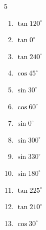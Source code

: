 \begin{multicols}{5}
\begin{enumerate}
  \item $\displaystyle \tan{120^\circ}$


  \item $\displaystyle \tan{0^\circ}$

        \phantom{$\displaystyle =0$}

  \item $\displaystyle \tan{240^\circ}$


  \item $\displaystyle \cos{45^\circ}$


  \item $\displaystyle \sin{30^\circ}$


  \item $\displaystyle \cos{60^\circ}$


  \item $\displaystyle \sin{0^\circ}$

        \phantom{$\displaystyle =0$}

  \item $\displaystyle \sin{300^\circ}$


  \item $\displaystyle \sin{330^\circ}$


  \item $\displaystyle \sin{180^\circ}$

        \phantom{$\displaystyle =0$}

  \item $\displaystyle \tan{225^\circ}$

        \phantom{$\displaystyle =1$}

  \item $\displaystyle \tan{210^\circ}$


  \item $\displaystyle \cos{30^\circ}$



\end{enumerate}
\end{multicols}
